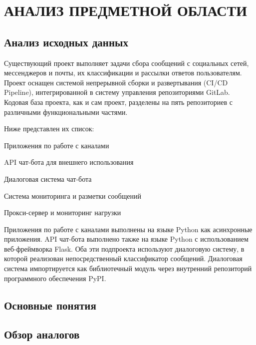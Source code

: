 \section{АНАЛИЗ ПРЕДМЕТНОЙ ОБЛАСТИ}
    \subsection{Анализ исходных данных}
    Существующий проект выполняет задачи сбора сообщений с социальных сетей, мессенджеров и почты, их классификации и рассылки ответов пользователям.
    Проект оснащен системой непрерывной сборки и развертывания (CI/CD Pipeline), интегрированной в систему управления репозиториями GitLab.
    Кодовая база проекта, как и сам проект, разделены на пять репозиториев с различными функциональными частями.
    
    Ниже представлен их список:
    \item Приложения по работе с каналами
    \item API чат-бота для внешнего использования
    \item Диалоговая система чат-бота
    \item Система мониторинга и разметки сообщений
    \item Прокси-сервер и мониторинг нагрузки

    Приложения по работе с каналами выполнены на языке Python как асинхронные приложения.
    API чат-бота выполнено также на языке Python с использованием веб-фреймворка Flask.
    Оба эти подпроекта используют диалоговую систему, в которой реализован непосредственный классификатор сообщений.
    Диалоговая система импортируется как библиотечный модуль через внутренний репозиторий программного обеспечения PyPI.

    \subsection{Основные понятия}
    \subsection{Обзор аналогов}